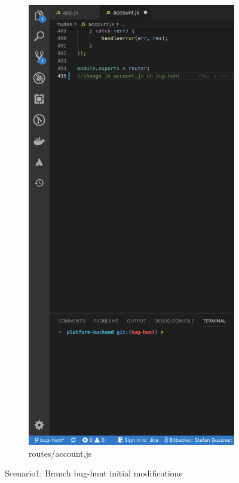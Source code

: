 \begin{figure}[h]
\begin{subfigure}{.5\textwidth}
        \includegraphics[width=1\linewidth]{figures/screenshots/scenarios/1accountjs_on_bughunt.png}
        \caption{routes/account.js}
        \label{fig:1account_on_bughunt}
    \end{subfigure}
    \caption{Scenario1: Branch bug-hunt initial modifications}
\end{figure}

